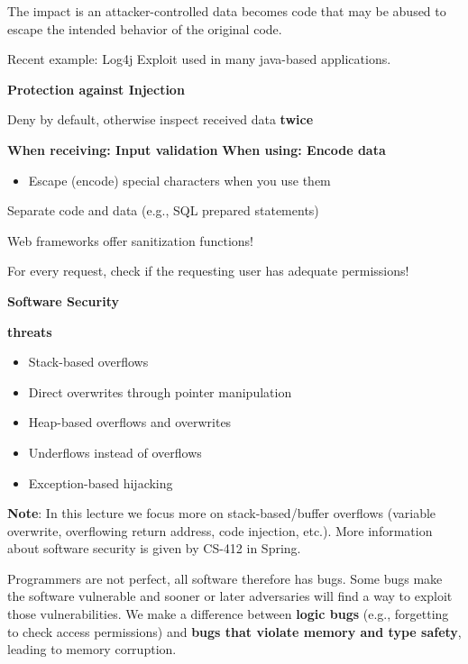 \documentclass[11pt]{article}
\begin{document}
The impact is an attacker-controlled data becomes code that may be abused to escape the intended behavior of the original code. 

Recent example: Log4j Exploit used in many java-based applications.

\textbf{Protection against Injection}

Deny by default, otherwise inspect received data \textbf{twice}

\textbf{When receiving: Input validation}
\textbf{When using: Encode data}
\begin{itemize}
	\item Escape (encode) special characters when you use them
\end{itemize}

Separate code and data (e.g., SQL prepared statements)

Web frameworks offer sanitization functions! 

For every request, check if the requesting user has adequate permissions!

\vspace{0.5cm}

\begin{center}
  {\LARGE \textbf{Software Security}}
\end{center}
\vspace{0.5cm}

\textbf{threats}
\begin{itemize}
	\item Stack-based overflows 
	\item Direct overwrites through pointer manipulation
	\item Heap-based overflows and overwrites
	\item Underflows instead of overflows
	\item Exception-based hijacking
\end{itemize}

\textbf{Note}: In this lecture we focus more on stack-based/buffer overflows (variable overwrite, overflowing return address, code injection, etc.). More information about software security is given by CS-412 in Spring. 

Programmers are not perfect, all software therefore has bugs. Some bugs make the software vulnerable and sooner or later adversaries will find a way to exploit those vulnerabilities. We make a difference between \textbf{logic bugs} (e.g., forgetting to check access permissions) and \textbf{bugs that violate memory and type safety}, leading to memory corruption.
\end{document}
